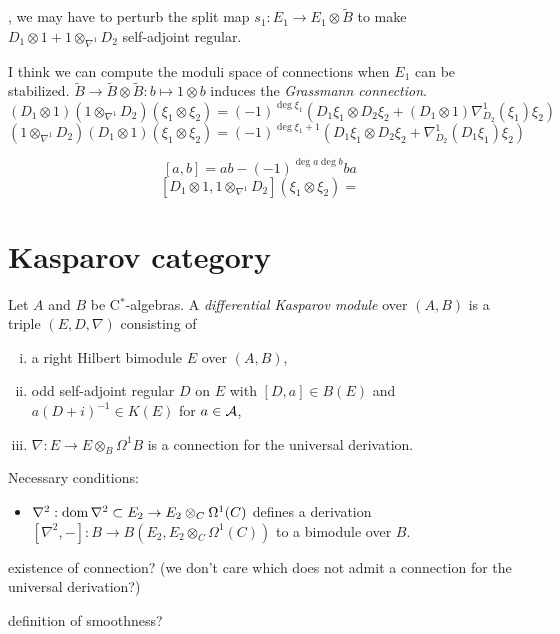 \documentclass{../../large}
\begin{document}
, we may have to perturb the split map $s_1:E_1\to E_1\otimes\tilde B$ to make $D_1\otimes1+1\otimes_{\nabla^1}D_2$ self-adjoint regular.

I think we can compute the moduli space of connections when $E_1$ can be stabilized.
$\tilde B\to\tilde B\otimes\tilde B:b\mapsto1\otimes b$ induces the \emph{Grassmann connection}.
\[(D_1\otimes1)(1\otimes_{\nabla^1}D_2)(\xi_1\otimes\xi_2)=(-1)^{\deg\xi_1}(D_1\xi_1\otimes D_2\xi_2+(D_1\otimes1)\nabla_{D_2}^1(\xi_1)\xi_2)\]
\[(1\otimes_{\nabla^1}D_2)(D_1\otimes1)(\xi_1\otimes\xi_2)=(-1)^{\deg\xi_1+1}(D_1\xi_1\otimes D_2\xi_2+\nabla_{D_2}^1(D_1\xi_1)\xi_2)\]

\[[a,b]=ab-(-1)^{\deg a\deg b}ba\]
\[[D_1\otimes1,1\otimes_{\nabla^1}D_2](\xi_1\otimes\xi_2)=\]



\section{Kasparov category}

\begin{prb}
Let $A$ and $B$ be C$^*$-algebras.
A \emph{differential Kasparov module} over $(A,B)$ is a triple $(E,D,\nabla)$ consisting of
\begin{enumerate}[(i)]
\item a right Hilbert bimodule $E$ over $(A,B)$,
\item odd self-adjoint regular $D$ on $E$ with $[D,a]\in B(E)$ and $a(D+i)^{-1}\in K(E)$ for $a\in\mathcal{A}$,
\item $\nabla:E\to E\otimes_B\Omega^1B$ is a connection for the universal derivation.
\end{enumerate}

Necessary conditions:
\begin{itemize}
\item $\nabla^2:\operatorname{dom}\nabla^2\subset E_2\to E_2\otimes_C\Omega^1(C)$ defines a derivation $[\nabla^2,-]:B\to B(E_2,E_2\otimes_C\Omega^1(C))$ to a bimodule over $B$.
\end{itemize}


\begin{parts}
\item existence of connection? (we don't care which does not admit a connection for the universal derivation?)
\item definition of smoothness?
\end{parts}
\end{prb}
\end{document}
